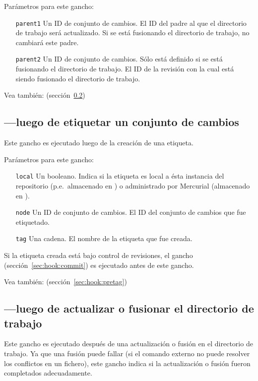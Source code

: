 Parámetros para este gancho:
\begin{itemize}
\item[\texttt{parent1}] Un ID de conjunto de cambios. El ID del
  padre al que el directorio de trabajo será actualizado. Si se está
  fusionando el directorio de trabajo, no cambiará este padre.
\item[\texttt{parent2}] Un ID de conjunto de cambios. Sólo está
  definido si se está fusionando el directorio de trabajo. El ID de la
  revisión con la cual está siendo fusionado el directorio de trabajo.
\end{itemize}

Vea también:  (sección~\ref{sec:hook:update})

\subsection{---luego de etiquetar un conjunto de cambios}
\label{sec:hook:tag}

Este gancho es ejecutado luego de la creación de una etiqueta.

Parámetros para este gancho:
\begin{itemize}
\item[\texttt{local}] Un booleano. Indica si la etiqueta es local a
  ésta instancia del repositorio (p.e.~almacenado en
  ) o administrado por Mercurial (almacenado
  en ).
\item[\texttt{node}] Un ID de conjunto de cambios. El ID del
  conjunto de cambios que fue etiquetado.
\item[\texttt{tag}] Una cadena. El nombre de la etiqueta que fue
  creada.
\end{itemize}

Si la etiqueta creada está bajo control de revisiones, el gancho
 (sección~\ref{sec:hook:commit}) es ejecutado antes de
este gancho.

Vea también:  (sección~\ref{sec:hook:pretag})

\subsection{---luego de actualizar o fusionar el
directorio de trabajo}
\label{sec:hook:update}

Este gancho es ejecutado después de una actualización o fusión en el
directorio de trabajo. Ya que una fusión puede fallar (si el comando
externo  no puede resolver los conflictos en un
fichero), este gancho indica si la actualización o fusión fueron
completados adecuadamente.

